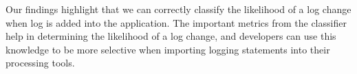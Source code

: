 Our findings highlight that we can correctly classify the likelihood of a log change when log is added into the application. The important metrics from the classifier help in determining the likelihood of a log change, and developers can use this knowledge to be more selective when importing logging statements into their processing tools. 




